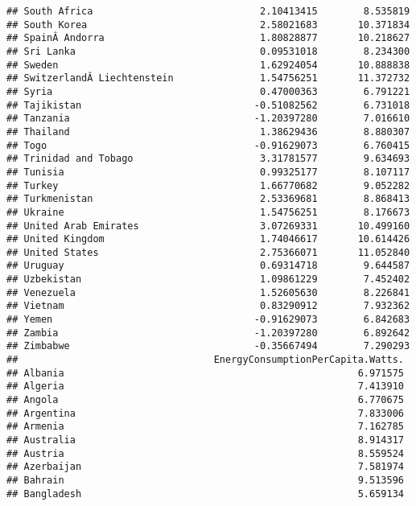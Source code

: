\documentclass[
]{article}
\begin{document}
\begin{verbatim}
## South Africa                             2.10413415        8.535819
## South Korea                              2.58021683       10.371834
## SpainÂ Andorra                           1.80828877       10.218627
## Sri Lanka                                0.09531018        8.234300
## Sweden                                   1.62924054       10.888838
## SwitzerlandÂ Liechtenstein               1.54756251       11.372732
## Syria                                    0.47000363        6.791221
## Tajikistan                              -0.51082562        6.731018
## Tanzania                                -1.20397280        7.016610
## Thailand                                 1.38629436        8.880307
## Togo                                    -0.91629073        6.760415
## Trinidad and Tobago                      3.31781577        9.634693
## Tunisia                                  0.99325177        8.107117
## Turkey                                   1.66770682        9.052282
## Turkmenistan                             2.53369681        8.868413
## Ukraine                                  1.54756251        8.176673
## United Arab Emirates                     3.07269331       10.499160
## United Kingdom                           1.74046617       10.614426
## United States                            2.75366071       11.052840
## Uruguay                                  0.69314718        9.644587
## Uzbekistan                               1.09861229        7.452402
## Venezuela                                1.52605630        8.226841
## Vietnam                                  0.83290912        7.932362
## Yemen                                   -0.91629073        6.842683
## Zambia                                  -1.20397280        6.892642
## Zimbabwe                                -0.35667494        7.290293
##                                  EnergyConsumptionPerCapita.Watts.
## Albania                                                   6.971575
## Algeria                                                   7.413910
## Angola                                                    6.770675
## Argentina                                                 7.833006
## Armenia                                                   7.162785
## Australia                                                 8.914317
## Austria                                                   8.559524
## Azerbaijan                                                7.581974
## Bahrain                                                   9.513596
## Bangladesh                                                5.659134

\end{verbatim}
\end{document}
